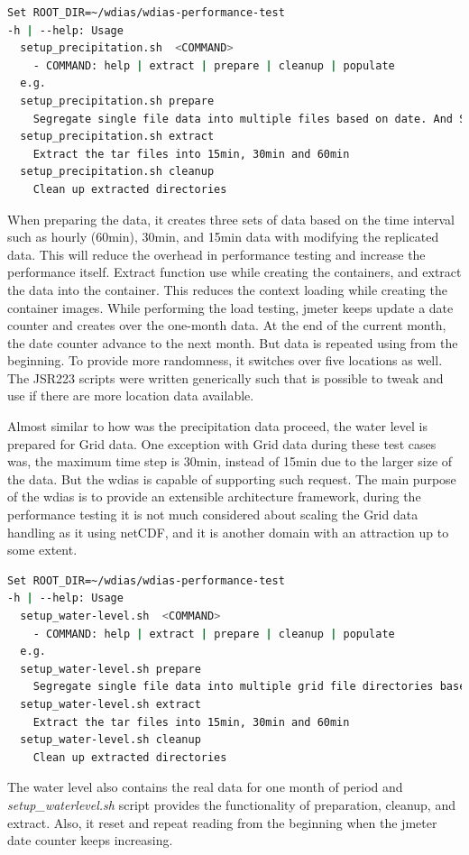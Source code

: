 \begin{lstlisting}[language=sh, caption=Preparation of precipitation data.]
Set ROOT_DIR=~/wdias/wdias-performance-test
-h | --help: Usage
  setup_precipitation.sh  <COMMAND>
    - COMMAND: help | extract | prepare | cleanup | populate
  e.g.
  setup_precipitation.sh prepare
    Segregate single file data into multiple files based on date. And Separate into main directories of 15min, 30min, 60min and create tar files
  setup_precipitation.sh extract
    Extract the tar files into 15min, 30min and 60min
  setup_precipitation.sh cleanup
    Clean up extracted directories
\end{lstlisting}
When preparing the data, it creates three sets of data based on the time interval such as hourly (60min), 30min, and 15min data with modifying the replicated data.
This will reduce the overhead in performance testing and increase the performance itself.
Extract function use while creating the containers, and extract the data into the container. This reduces the context loading while creating the container images.
While performing the load testing, \acrshort{jmeter} keeps update a date counter and creates over the one-month data. At the end of the current month, the date counter advance to the next month. But data is repeated using from the beginning. To provide more randomness, it switches over five locations as well. The JSR223 scripts were written generically such that is possible to tweak and use if there are more location data available.

Almost similar to how was the precipitation data proceed, the water level is prepared for Grid data. One exception with Grid data during these test cases was, the maximum time step is 30min, instead of 15min due to the larger size of the data. But the \acrshort{wdias} is capable of supporting such request. The main purpose of the \acrshort{wdias} is to provide an extensible architecture framework, during the performance testing it is not much considered about scaling the Grid data handling as it using \acrshort{netCDF}, and it is another domain with an attraction up to some extent.

\begin{lstlisting}[language=sh, caption= Preparation of water-level data.]
Set ROOT_DIR=~/wdias/wdias-performance-test
-h | --help: Usage
  setup_water-level.sh  <COMMAND>
    - COMMAND: help | extract | prepare | cleanup | populate
  e.g.
  setup_water-level.sh prepare
    Segregate single file data into multiple grid file directories based on date. And Separate into main directories of 15min, 30min, 60min and create tar files
  setup_water-level.sh extract
    Extract the tar files into 15min, 30min and 60min
  setup_water-level.sh cleanup
    Clean up extracted directories
\end{lstlisting}
The water level also contains the real data for one month of period and \emph{setup\_waterlevel.sh} script provides the functionality of preparation, cleanup, and extract.
Also, it reset and repeat reading from the beginning when the \acrshort{jmeter} date counter keeps increasing.


